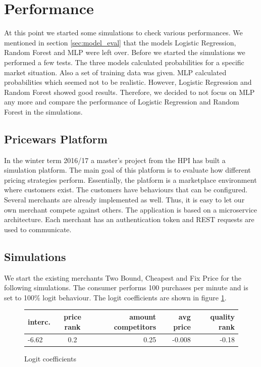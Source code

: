 \section{Performance}
\label{sec:performance}
    At this point we started some simulations to check various performances. We mentioned in section \ref{sec:model_eval} that the models Logistic Regression, Random Forest and MLP were left over. Before we started the simulations we performed a few tests. The three models calculated probabilities for a specific market situation. Also a set of training data was given. MLP calculated probabilities which seemed not to be realistic. However, Logistic Regression and Random Forest showed good results. Therefore, we decided to not focus on MLP any more and compare the performance of Logistic Regression and Random Forest in the simulations.

\subsection{Pricewars Platform}
    In the winter term 2016/17 a master's project from the HPI has built a simulation platform. The main goal of this platform is to evaluate how different pricing strategies perform. Essentially, the platform is a marketplace environment where customers exist. The customers have behaviours that can be configured. Several merchants are already implemented as well. Thus, it is easy to let our own merchant compete against others. The application is based on a microservice architecture. Each merchant has an authentication token and REST requests are used to communicate.

\subsection{Simulations}
    We start the existing merchants Two Bound, Cheapest and Fix Price for the following simulations. The consumer performs 100 purchases per minute and is set to 100\% logit behaviour. The logit coefficients are shown in figure \ref{fig1}.
    \begin{figure}[ht]
    \centering
        \begin{tabular}{ l | c | r | r | r}
            interc. & price rank & amount competitors & avg price & quality rank \\
            \hline  
            -6.62 & 0.2 & 0.25 & -0.008 & -0.18 \\
        \end{tabular}
    \caption{Logit coefficients}
    \label{fig1}
    \end{figure}

